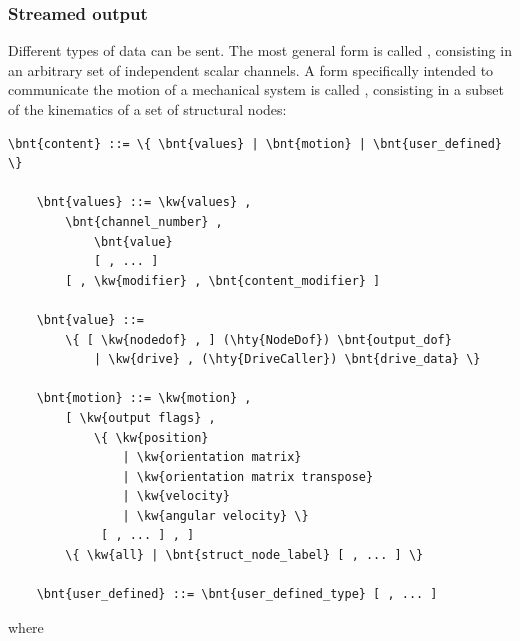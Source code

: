 \subsubsection{Streamed output}
\label{sec:EL:OUTELEM:STREAM_OUTPUT:STREAMED_OUTPUT}
Different types of data can be sent.
The most general form is called , consisting
in an arbitrary set of independent scalar channels.
A form specifically intended to communicate the motion
of a mechanical system is called , consisting
in a subset of the kinematics of a set of structural nodes:
\begin{Verbatim}[commandchars=\\\{\}]
    \bnt{content} ::= \{ \bnt{values} | \bnt{motion} | \bnt{user_defined} \}

    \bnt{values} ::= \kw{values} ,
        \bnt{channel_number} ,
            \bnt{value}
            [ , ... ]
        [ , \kw{modifier} , \bnt{content_modifier} ]

    \bnt{value} ::=
        \{ [ \kw{nodedof} , ] (\hty{NodeDof}) \bnt{output_dof}
            | \kw{drive} , (\hty{DriveCaller}) \bnt{drive_data} \}

    \bnt{motion} ::= \kw{motion} ,
        [ \kw{output flags} ,
            \{ \kw{position}
                | \kw{orientation matrix}
                | \kw{orientation matrix transpose}
                | \kw{velocity}
                | \kw{angular velocity} \}
             [ , ... ] , ]
        \{ \kw{all} | \bnt{struct_node_label} [ , ... ] \}

    \bnt{user_defined} ::= \bnt{user_defined_type} [ , ... ]
\end{Verbatim}
where
